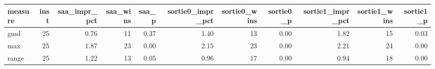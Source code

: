 \begin{tabular}{lrrrrrrrrrr}
\toprule
measure & inst & saa_impr_pct & saa_wins & saa_p & sortie0_impr_pct & sortie0_wins & sortie0_p & sortie1_impr_pct & sortie1_wins & sortie1_p \\
\midrule
gmd & 25 & 0.76 & 11 & 0.37 & 1.40 & 13 & 0.00 & 1.82 & 15 & 0.03 \\
max & 25 & 1.87 & 23 & 0.00 & 2.15 & 23 & 0.00 & 2.21 & 24 & 0.00 \\
range & 25 & 1.22 & 13 & 0.05 & 0.96 & 17 & 0.00 & 0.94 & 18 & 0.00 \\
\bottomrule
\end{tabular}
